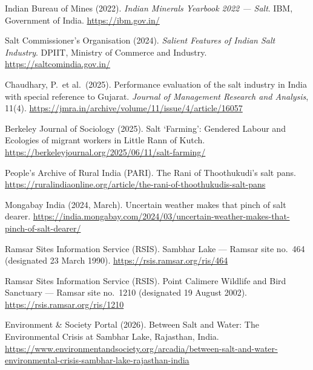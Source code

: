 \documentclass[12pt,a4paper]{article}
\begin{document}
\begin{enumerate}[leftmargin=*, label={[\arabic*]}]
  \item Indian Bureau of Mines (2022). \textit{Indian Minerals Yearbook 2022 --- Salt}.
        IBM, Government of India. \url{https://ibm.gov.in/}

  \item Salt Commissioner's Organisation (2024). \textit{Salient Features of Indian Salt
        Industry}. DPIIT, Ministry of Commerce and Industry.
        \url{https://saltcomindia.gov.in/}

  \item Chaudhary, P.\ et al.\ (2025). Performance evaluation of the salt industry in
        India with special reference to Gujarat. \textit{Journal of Management Research
        and Analysis}, 11(4). \url{https://jmra.in/archive/volume/11/issue/4/article/16057}

  \item Berkeley Journal of Sociology (2025). Salt `Farming': Gendered Labour and
        Ecologies of migrant workers in Little Rann of Kutch.
        \url{https://berkeleyjournal.org/2025/06/11/salt-farming/}

  \item People's Archive of Rural India (PARI). The Rani of Thoothukudi's salt pans.
        \url{https://ruralindiaonline.org/article/the-rani-of-thoothukudis-salt-pans}

  \item Mongabay India (2024, March). Uncertain weather makes that pinch of salt dearer.
        \url{https://india.mongabay.com/2024/03/uncertain-weather-makes-that-pinch-of-salt-dearer/}

  \item Ramsar Sites Information Service (RSIS). Sambhar Lake --- Ramsar site no.\ 464
        (designated 23 March 1990). \url{https://rsis.ramsar.org/ris/464}

  \item Ramsar Sites Information Service (RSIS). Point Calimere Wildlife and Bird
        Sanctuary --- Ramsar site no.\ 1210 (designated 19 August 2002).
        \url{https://rsis.ramsar.org/ris/1210}

  \item Environment \& Society Portal (2026). Between Salt and Water: The Environmental
        Crisis at Sambhar Lake, Rajasthan, India.
        \url{https://www.environmentandsociety.org/arcadia/between-salt-and-water-environmental-crisis-sambhar-lake-rajasthan-india}


\end{enumerate}
\end{document}
